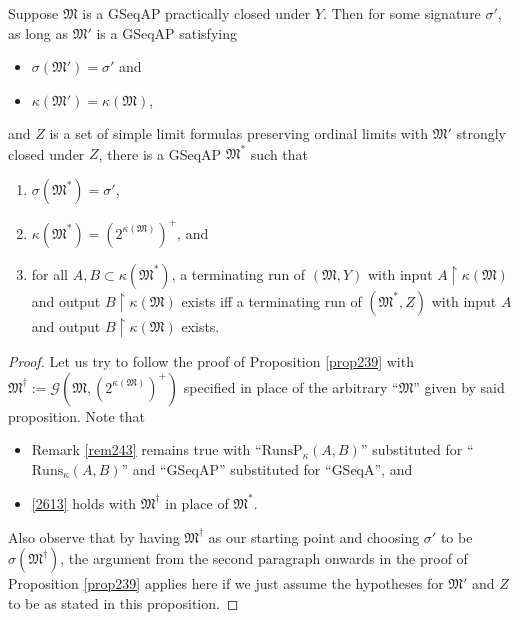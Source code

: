 \documentclass[12pt]{article}
\numberwithin{equation}{section}
\begin{document}
\begin{prop}\label{prop261}
Suppose $\mathfrak{M}$ is a GSeqAP practically closed under $Y$. Then for some signature $\sigma'$, as long as $\mathfrak{M}'$ is a GSeqAP satisfying
\begin{itemize}
    \item $\sigma(\mathfrak{M}') = \sigma'$ and
    \item $\kappa(\mathfrak{M}') = \kappa(\mathfrak{M})$,
\end{itemize}
and $Z$ is a set of simple limit formulas preserving ordinal limits with $\mathfrak{M}'$ strongly closed under $Z$, there is a GSeqAP $\mathfrak{M}^*$ such that
\begin{enumerate}[label=(\alph*)]
    \item $\sigma(\mathfrak{M}^*) = \sigma'$,
    \item $\kappa(\mathfrak{M}^*) = (2^{\kappa(\mathfrak{M})})^+$, and
    \item\label{2613} for all $A, B \subset \kappa(\mathfrak{M}^*)$, a terminating run of $(\mathfrak{M}, Y)$ with input $A \restriction \kappa(\mathfrak{M})$ and output $B \restriction \kappa(\mathfrak{M})$ exists iff a terminating run of $(\mathfrak{M}^*, Z)$ with input $A$ and output $B \restriction \kappa(\mathfrak{M})$ exists.
\end{enumerate}
\end{prop}

\begin{proof}
Let us try to follow the proof of Proposition \ref{prop239} with $\mathfrak{M}^{\dagger} := \mathcal{G}(\mathfrak{M}, (2^{\kappa(\mathfrak{M})})^+)$ specified in place of the arbitrary ``$\mathfrak{M}$'' given by said proposition. Note that 
\begin{itemize}
    \item Remark \ref{rem243} remains true with ``$\mathrm{RunsP}_{\kappa}(A, B)$'' substituted for ``$\mathrm{Runs}_{\kappa}(A, B)$'' and ``GSeqAP'' substituted for ``GSeqA'', and 
    \item \ref{2613} holds with $\mathfrak{M}^{\dagger}$ in place of $\mathfrak{M}^*$.
\end{itemize}
Also observe that by having $\mathfrak{M}^{\dagger}$ as our starting point and choosing $\sigma'$ to be $\sigma(\mathfrak{M}^{\dagger})$, the argument from the second paragraph onwards in the proof of Proposition \ref{prop239} applies here if we just assume the hypotheses for $\mathfrak{M}'$ and $Z$ to be as stated in this proposition. 
\end{proof}
\end{document}
